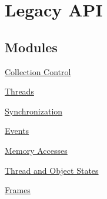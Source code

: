 \hypertarget{group__legacy}{\section{Legacy A\-P\-I}
\label{group__legacy}
}
\subsection*{Modules}
\begin{DoxyCompactItemize}
\item 
\hyperlink{group__legacy__control}{Collection Control}
\item 
\hyperlink{group__legacy__threads}{Threads}
\item 
\hyperlink{group__legacy__sync}{Synchronization}
\item 
\hyperlink{group__legacy__events}{Events}
\item 
\hyperlink{group__legacy__memory}{Memory Accesses}
\item 
\hyperlink{group__legacy__state}{Thread and Object States}
\item 
\hyperlink{group__frames}{Frames}
\end{DoxyCompactItemize}

